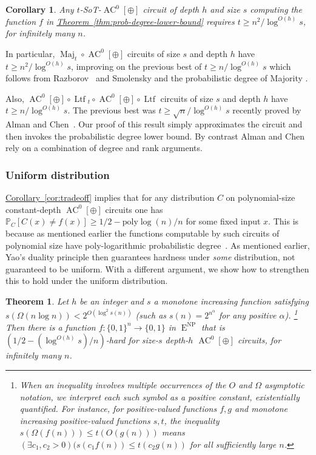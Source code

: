 \documentclass[11pt]{article}
\newcommand{\expref}[2]{\texorpdfstring{\hyperref[#2]{#1~\ref{#2}}}{#1~\ref{#2}}}
\newtheorem{thm}[theorem]{Theorem}
\newtheorem{cor}[theorem]{Corollary}
\DeclareMathOperator{\Maj}{\mathrm{Maj}}  %
\DeclareMathOperator{\Ltf}{\mathrm{Ltf}}  %
\DeclareMathOperator{\AC}{\mathrm{AC}}  %
\DeclareMathOperator{\NP}{\mathrm{NP}}  %
\DeclareMathOperator{\EEE}{\mathrm{E}}  %
\newcommand{\zo}{\{0, 1\}}
\renewcommand{\P}{\mathbb{P}}
\newcommand{\poly}{\mathrm{poly}}
\begin{document}
\begin{cor}
\label{cor:SOT-lower-bounds} Any $t$-SoT-$\AC^{0}[\oplus]$ circuit
of depth $h$ and size $s$ computing the function $f$ in \expref{Theorem}{thm:prob-degree-lower-bound} requires $t\ge n^{2}/\log^{O(h)}s$,
for infinitely many $n$.
\end{cor}

In particular, $\Maj_{t}\circ \AC^{0}[\oplus]$ circuits of size $s$
and depth $h$ have $t\ge n^{2}/\log^{O(h)}s$, improving on the previous
best of $t\ge n/\log^{O(h)}s$ which follows from Razborov~\cite{Raz87}
and Smolensky \cite{Smo87,Smolensky93} and the probabilistic degree
of Majority \cite{DBLP:conf/fsttcs/Srinivasan13,DBLP:conf/focs/AlmanW15}.

Also, $\AC^{0}[\oplus]\circ \Ltf{}_{t}\circ \AC^{0}[\oplus]\circ \Ltf$
circuits of size $s$ and depth $h$ have $t\ge n/\log^{O(h)}s$.
The previous best was $t\ge\sqrt{n}/\log^{O(h)}s$ recently proved
by Alman and Chen~\cite{AlmanC19}. Our proof of this result simply
approximates the circuit and then invokes the probabilistic degree
lower bound. By contrast Alman and Chen rely on a combination of degree
and rank arguments.

\subsubsection{Uniform distribution}

\expref{Corollary}{cor:tradeoff} implies that for any distribution $C$
on polynomial-size constant-depth $\AC^{0}[\oplus]$ circuits one has
$\P_{C}[C(x)\ne f(x)]\ge1/2-\poly\log(n)/n$ for some fixed input
$x$. This is because as mentioned earlier the functions computable
by such circuits of %
polynomial size  %
have poly-logarithmic probabilistic
degree~\cite{Raz87}. As mentioned earlier, Yao's duality principle
\cite{DBLP:conf/focs/Yao77} then guarantees hardness under \emph{some
}distribution, not guaranteed to be uniform. With a different argument,
we show how to strengthen this to hold under the uniform distribution.
\begin{thm}
  \label{thm:uniform} Let $h$ be an integer and $s$ a
monotone increasing  %
function satisfying
%
%
$s(\Omega(n\log n)) < 2^{O(\log^{2}s(n))}$  %
%
%
%
%
(such as $s(n)=2^{n^{\alpha}}$
for any
positive  %
$\alpha$).%
\footnote{When an inequality involves multiple occurrences of the $O$ and $\Omega$
  asymptotic notation, we interpret each such symbol as a positive constant,
  existentially quantified.  For instance, for positive-valued functions $f,g$ and
  monotone increasing positive-valued functions $s,t$, the inequality
  $s(\Omega(f(n)))\le t(O(g(n)))$ means $(\exists c_1, c_2 > 0)
  (s(c_1 f(n)) \le t(c_2 g(n))$ for all sufficiently large $n$.}
%
%
%
%
Then there %
is a function $f:\zo^{n}\to\zo$ in $\EEE^{\NP}$ that is $(1/2-(\log^{O(h)}s)/n)$-hard
for size-$s$ depth-$h$ $\AC^{0}[\oplus]$ circuits, for infinitely
many $n$.
\end{thm}
%
\end{document}
